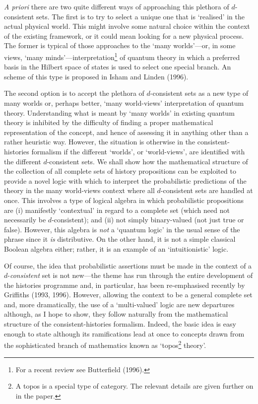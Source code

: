 	{\em A priori\/} there are two quite different ways of
approaching this plethora of $d$-consistent sets. The first is to
try to select a unique one that is `realised' in the actual physical
world.  This might involve some natural choice within the context of
the existing framework, or it could mean looking for a new physical
process. The former is typical of those approaches to the `many
worlds'---or, in some views, `many
minds'---interpretation\footnote{For a recent review see Butterfield
(1996).} of quantum theory in which a preferred basis
in the Hilbert space of states is used to select one special branch.
An scheme of this type is proposed in Isham and Linden (1996).

	The second option is to accept the plethora of $d$-consistent
sets as a new type of many worlds or, perhaps better, `many
world-views' interpretation of quantum theory.  Understanding what
is meant by `many worlds' in existing quantum theory is inhibited by
the difficulty of finding a proper mathematical representation of
the concept, and hence of assessing it in anything other than a
rather heuristic way. However, the situation is otherwise in the
consistent-histories formalism if the different `worlds', or
`world-views', are identified with the different $d$-consistent
sets. We shall show how the mathematical structure of the collection
of all complete sets of history propositions can be exploited to
provide a novel logic with which to interpret the probabilistic
predictions of the theory in the many world-views context where all
$d$-consistent sets are handled at once.  This involves a type of
logical algebra in which probabilistic propositions are (i)
manifestly `contextual' in regard to a complete set (which need not
necessarily be $d$-consistent); and (ii) not simply binary-valued
(\ie not just true or false). However, this algebra is {\em not\/} a
`quantum logic' in the usual sense of the phrase since it {\em is\/}
distributive. On the other hand, it is not a simple classical
Boolean algebra either; rather, it is an example of an
`intuitionistic' logic.

	Of course, the idea that probabilistic assertions must be made
in the context of a $d$-{\em consistent\/} set is not new---the
theme has run through the entire development of the histories
programme and, in particular, has been re-emphasised recently by
Griffiths (1993, 1996).  However, allowing the context to be a
general complete set and, more dramatically, the use of a
`multi-valued' logic are new departures although, as I hope to show,
they follow naturally from the mathematical structure of the
consistent-histories formalism.  Indeed, the basic idea is easy
enough to state although its ramifications lead at once to concepts
drawn from the sophisticated branch of mathematics known as
`topos\footnote{A topos is a special type of category. The relevant
details are given further on in the paper.} theory'.

